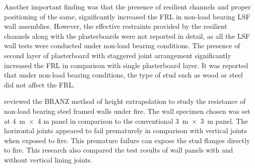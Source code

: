 Another important finding was that the presence of resilient channels and proper positioning of the same, significantly increased the FRL in non-load bearing LSF wall assemblies. However, the effective restraints provided by the resilient channels along with the plasterboards were not reported in detail, as all the LSF wall tests were conducted under non-load bearing conditions. The presence of second layer of plasterboard with staggered joint arrangement significantly increased the FRL in comparison with single plasterboard layer. It was reported that under non-load bearing conditions, the type of stud such as wood or steel did not affect the FRL.  

\citet{Collier2002} reviewed the BRANZ method of height extrapolation to study the resistance of non-load bearing steel framed walls under fire. The wall specimen chosen was set at 4~m~$\times$~4 m panel in comparison to the conventional 3~m~$\times$~3~m panel. The horizontal joints appeared to fail prematurely in comparison with vertical joints when exposed to fire. This premature failure can expose the stud flanges directly to fire. This research also compared the test results of wall panels with and without vertical lining joints.


